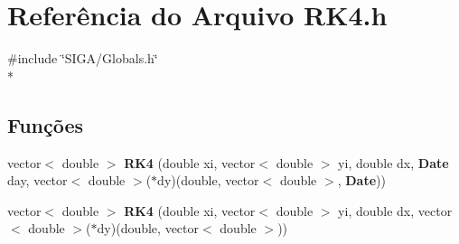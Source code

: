 \section{Referência do Arquivo R\+K4.\+h}
\label{_r_k4_8h}
{\ttfamily \#include \char`\"{}S\+I\+G\+A/\+Globals.\+h\char`\"{}}\\*
\subsection*{Funções}
\begin{DoxyCompactItemize}
\item 
vector$<$ double $>$ {\bf R\+K4} (double xi, vector$<$ double $>$ yi, double dx, {\bf Date} day, vector$<$ double $>$($\ast$dy)(double, vector$<$ double $>$, {\bf Date}))
\item 
vector$<$ double $>$ {\bf R\+K4} (double xi, vector$<$ double $>$ yi, double dx, vector$<$ double $>$($\ast$dy)(double, vector$<$ double $>$))
\end{DoxyCompactItemize}
